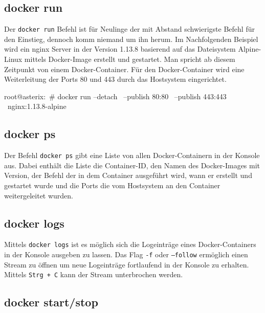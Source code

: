 \subsection{docker run}%
\label{sec:docker-befehle.run}

Der \texttt{docker run} Befehl ist für Neulinge der mit Abstand schwierigste
Befehl für den Einstieg, dennoch komm niemand um ihn herum. Im Nachfolgenden
Beispiel wird ein nginx Server in der Version 1.13.8 basierend auf das
Dateisystem Alpine-Linux mittels Docker-Image erstellt und gestartet. Man
spricht ab diesem Zeitpunkt von einem Docker-Container. Für den Docker-Container
wird eine Weiterleitung der Ports 80 und 443 durch das Hostsystem eingerichtet.

\begin{bashcode}
  root@asterix:~# docker run --detach \
    --publish 80:80 \
    --publish 443:443 \
    nginx:1.13.8-alpine
\end{bashcode}

\subsection{docker ps}%
\label{sec:docker-befehle.ps}

Der Befehl \texttt{docker ps} gibt eine Liste von allen Docker-Containern in der
Konsole aus. Dabei enthält die Liste die Container-ID, den Namen des
Docker-Images mit Version, der Befehl der in dem Container ausgeführt wird, wann
er erstellt und gestartet wurde und die Ports die vom Hostsystem an den
Container weitergeleitet wurden.

\subsection{docker logs}%
\label{sec:docker-befehle.logs}

Mittels \texttt{docker logs} ist es möglich sich die Logeinträge eines
Docker-Containers in der Konsole ausgeben zu lassen. Das Flag \texttt{-f} oder
\texttt{--follow} ermöglich einen Stream zu öffnen um neue Logeinträge
fortlaufend in der Konsole zu erhalten. Mittels \texttt{Strg + C} kann der
Stream unterbrochen werden.

\subsection{docker start/stop}%
\label{sec:docker-befehle.start-stop}

